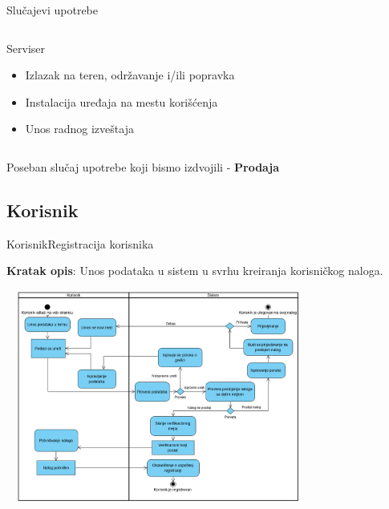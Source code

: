 \documentclass[9pt]{beamer}
\begin{document}
\begin{frame}{Slučajevi upotrebe}
\begin{center}
\begin{columns}
            \begin{alertblock}{Serviser}
            \begin{itemize}
                \item Izlazak na teren, održavanje i/ili popravka
                \item Instalacija uređaja na mestu korišćenja
                \item Unos radnog izveštaja
            \end{itemize}
            \end{alertblock}
    \end{columns}
    Poseban slučaj upotrebe koji bismo izdvojili - \textbf{\alert{Prodaja}}
    \end{center}
\end{frame}

\subsection{Korisnik}
\begin{frame}{Korisnik}{Registracija korisnika}
    \begin{center}
    \small{
    \textbf{Kratak opis}: Unos podataka u sistem u svrhu kreiranja korisničkog naloga.}
    \end{center}
    \begin{center}
        \includegraphics[width=10cm, height=7cm]{assets/dijagramAktivnostiRegistracija.png}
    \end{center}
\end{frame}
\end{document}
